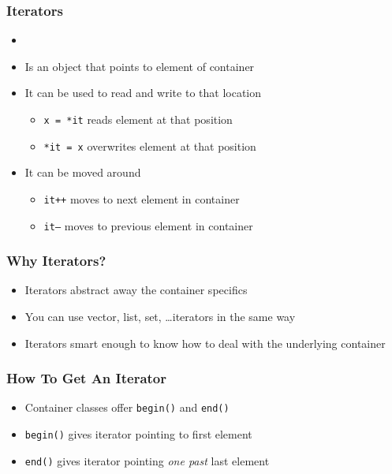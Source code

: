 \begin{frame}
  \frametitle{Iterators}
  \begin{itemize}
    \item {}
    \item Is an object that points to element of container
    \item It can be used to read and write to that location
          \begin{itemize}
            \item \texttt{x = *it} reads element at that position
            \item \texttt{*it = x} overwrites element at that position
          \end{itemize}
    \item It can be moved around
          \begin{itemize}
            \item \texttt{it++} moves to next element in container
            \item \texttt{it--} moves to previous element in container
          \end{itemize}
  \end{itemize}
\end{frame}

\begin{frame}
  \frametitle{Why Iterators?}
  \begin{itemize}
    \item Iterators abstract away the container specifics
    \item You can use vector, list, set, \dots iterators in the same way
    \item Iterators smart enough to know how to deal with the underlying container
  \end{itemize}
\end{frame}

\begin{frame}
  \frametitle{How To Get An Iterator}
  \begin{itemize}
    \item Container classes offer \texttt{begin()} and \texttt{end()}
    \item \texttt{begin()} gives iterator pointing to first element
    \item \texttt{end()} gives iterator pointing \emph{one past} last element
  \end{itemize}
\end{frame}

